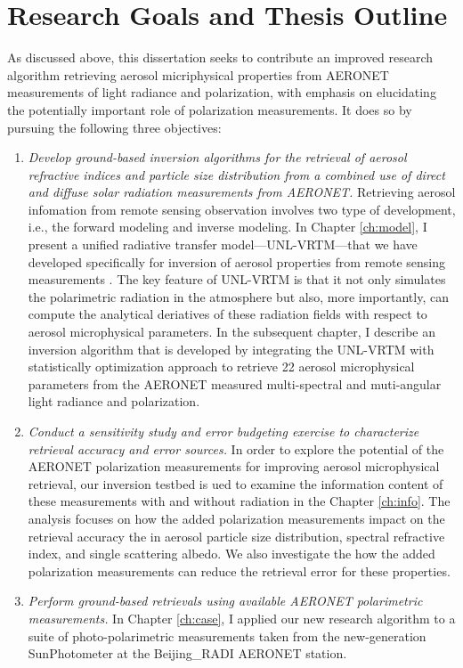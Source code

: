 \section{Research Goals and Thesis Outline} \label{sec:objective}

As discussed above, this dissertation seeks to contribute an improved
research algorithm retrieving aerosol micriphysical properties from AERONET
measurements of light radiance and polarization, with emphasis on elucidating
the potentially important role of polarization measurements. It does so by 
pursuing the following three objectives:

\begin{enumerate}
\item \textit{Develop ground-based inversion algorithms for the
retrieval of aerosol refractive indices and particle size distribution from a 
combined use of direct and diffuse solar radiation measurements from AERONET.}
\newline
Retrieving aerosol infomation from remote sensing observation
involves two type of development, i.e., the forward modeling and inverse
modeling. In Chapter \ref{ch:model}, I present a unified radiative transfer 
model---UNL-VRTM---that we have developed specifically for inversion of
aerosol properties from remote sensing measurements \citep{Wang14}. The
key feature of UNL-VRTM is that it not only simulates the
polarimetric radiation in the atmosphere but also, more importantly,
can compute the analytical deriatives of these radiation fields with respect
to aerosol microphysical parameters. In the subsequent chapter, I
describe an inversion algorithm that is developed by integrating the UNL-VRTM 
with statistically optimization approach to retrieve 22 aerosol
microphysical parameters from the AERONET measured multi-spectral and
muti-angular light radiance and polarization. 

\item \textit{Conduct a sensitivity study and error budgeting exercise to
characterize retrieval accuracy and error sources.} 
\newline 
In order to explore the potential of the AERONET polarization measurements
for improving aerosol microphysical retrieval, our inversion testbed is
ued to examine the information content of these measurements with and without
radiation in the Chapter \ref{ch:info}. The analysis focuses on
how the added polarization measurements impact on the retrieval accuracy
the in aerosol particle size distribution, spectral refractive
index, and single scattering albedo. We also investigate the how the 
added polarization measurements can reduce the retrieval error for these
properties.  

\item \textit{Perform ground-based retrievals using available AERONET
polarimetric measurements.}
\newline
In Chapter \ref{ch:case}, I applied our new research algorithm to a suite of
photo-polarimetric measurements taken from the new-generation SunPhotometer
at the Beijing\_RADI AERONET station.
\end{enumerate}
